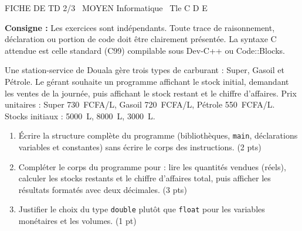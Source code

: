 \documentclass[11pt]{article}
\begin{document}
\begin{tcolorbox}[enhanced,colback=popink,colframe=popink,arc=10pt,boxrule=0pt,left=12pt,right=12pt,top=9pt,bottom=9pt]
{\color{white}\popxbold\small FICHE DE TD 2/3 \textbullet\ MOYEN \hfill Informatique \textbullet\ Tle C D E\par}
\end{tcolorbox}
\vspace{4pt}
\noindent \textbf{Consigne :} Les exercices sont indépendants. Toute trace de raisonnement, déclaration ou portion de code doit être clairement présentée. La syntaxe C attendue est celle standard (C99) compilable sous Dev-C++ ou Code::Blocks.

\begin{exercice}
Une station-service de Douala gère trois types de carburant : Super, Gasoil et Pétrole. Le gérant souhaite un programme affichant le stock initial, demandant les ventes de la journée, puis affichant le stock restant et le chiffre d'affaires. Prix unitaires : Super \SI{730}{FCFA/L}, Gasoil \SI{720}{FCFA/L}, Pétrole \SI{550}{FCFA/L}. Stocks initiaux : \SI{5000}{L}, \SI{8000}{L}, \SI{3000}{L}.
\begin{enumerate}
    \item Écrire la structure complète du programme (bibliothèques, \texttt{main}, déclarations variables et constantes) sans écrire le corps des instructions. (2 pts)
    \item Compléter le corps du programme pour : lire les quantités vendues (réels), calculer les stocks restants et le chiffre d'affaires total, puis afficher les résultats formatés avec deux décimales. (3 pts)
    \item Justifier le choix du type \texttt{double} plutôt que \texttt{float} pour les variables monétaires et les volumes. (1 pt)
\end{enumerate}
\end{exercice}
\end{document}
